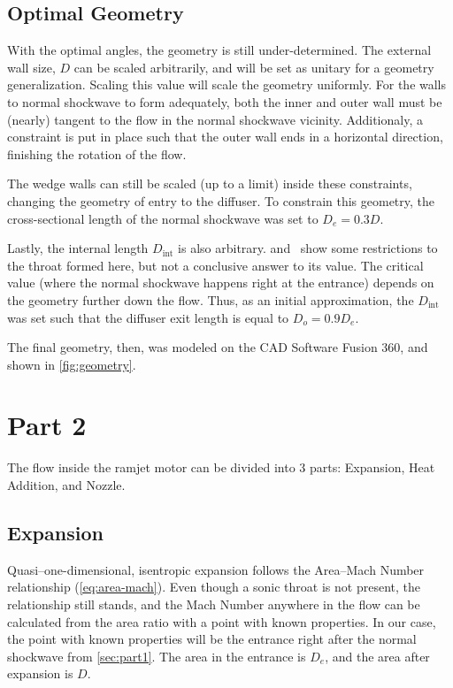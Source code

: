 \documentclass[12pt, openright, oneside, a4paper, english]{unbtex}
\begin{document}
\section{Optimal Geometry}

With the optimal angles, the geometry is still under-determined. The external wall size, \(D\) can be scaled arbitrarily, and will be set as unitary for a geometry generalization. Scaling this value will scale the geometry uniformly. For the walls to normal shockwave to form adequately, both the inner and outer wall must be (nearly) tangent to the flow in the normal shockwave vicinity. Additionaly, a constraint is put in place such that the outer wall ends in a horizontal direction, finishing the rotation of the flow.

The wedge walls can still be scaled (up to a limit) inside these constraints, changing the geometry of entry to the diffuser. To constrain this geometry, the cross-sectional length of the normal shockwave was set to \(D_e = 0.3 D\).

Lastly, the internal length \(D_{\operatorname{int}}\) is also arbitrary. \textcite{oswatitsch1944} and~\cite{hermann1956} show some restrictions to the throat formed here, but not a conclusive answer to its value. The critical value (where the normal shockwave happens right at the entrance) depends on the geometry further down the flow. Thus, as an initial approximation, the \(D_{\operatorname{int}}\) was set such that the diffuser exit length is equal to \(D_o = 0.9 D_e\).

The final geometry, then, was modeled on the CAD Software Fusion 360, and shown in \cref{fig:geometry}.


\chapter{Part 2}

The flow inside the ramjet motor can be divided into 3 parts: Expansion, Heat Addition, and Nozzle.

\section{Expansion}
\label{sec:expansion}

Quasi--one-dimensional, isentropic expansion follows the Area--Mach Number relationship (\cref{eq:area-mach}). Even though a sonic throat is not present, the relationship still stands, and the Mach Number anywhere in the flow can be calculated from the area ratio with a point with known properties. In our case, the point with known properties will be the entrance right after the normal shockwave from \cref{sec:part1}. The area in the entrance is \(D_e\), and the area after expansion is \(D\).
\end{document}
